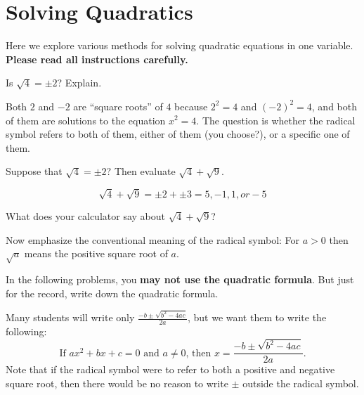 \newpage
\section{Solving Quadratics}\label{A:solvingQuadratics}
Here we explore various methods for solving quadratic equations in one variable.  \textbf{Please read all instructions carefully.}

\begin{prob}
Is $\sqrt{4}=\pm 2$?  Explain. 
\end{prob}

\vfill

\begin{teachingnote}
Both $2$ and $-2$ are ``square roots'' of $4$ because $2^2=4$ and $(-2)^2=4$, and both of them are solutions to the equation $x^2=4$.  The question is whether the radical symbol refers to both of them, either of them (you choose?), or a specific one of them.  
\end{teachingnote}

\begin{prob}
Suppose that $\sqrt{4}=\pm 2$?  Then evaluate $\sqrt{4}+\sqrt{9}$.  
\end{prob}

\begin{teachingnote}
$$\sqrt{4}+\sqrt{9}=\pm2+\pm3=5, -1, 1, or -5$$
\end{teachingnote}

\vfill

\begin{prob}
What does your calculator say about $\sqrt{4}+\sqrt{9}$?  
\end{prob}

\vfill 

\begin{teachingnote}
Now emphasize the conventional meaning of the radical symbol:  For $a>0$ then $\sqrt{a}$ means the positive square root of $a$.  
\end{teachingnote}



\begin{prob}
In the following problems, you \textbf{may not use the quadratic formula}.  But just for the record, write down the quadratic formula.  
\end{prob}
\begin{teachingnote}
Many students will write only $\frac{-b\pm\sqrt{b^2-4ac}}{2a}$, but we want them to write the following:  
$$\text{If }ax^2+bx+c=0\text{ and }a\ne 0\text{, then }x=\frac{-b\pm\sqrt{b^2-4ac}}{2a}\text{.}$$
Note that if the radical symbol were to refer to both a positive and negative square root, then there would be no reason to write $\pm$ outside the radical symbol.  
\end{teachingnote}
\vspace{0.8in}

